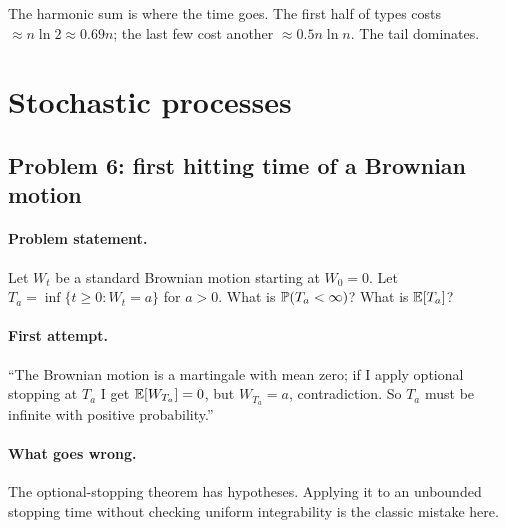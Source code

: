 \begin{intuitionbox}
The harmonic sum is where the time goes.  The first half of types
costs $\approx n \ln 2 \approx 0.69 n$; the last few cost another
$\approx 0.5 n \ln n$.  The tail dominates.
\end{intuitionbox}

\section{Stochastic processes}
\label{sec:stoch-problems}

\subsection{Problem 6: first hitting time of a Brownian motion}
\label{sec:hitting}

\paragraph{Problem statement.}
Let $W_t$ be a standard Brownian motion starting at $W_0 = 0$.
Let $T_a = \inf\{t \ge 0 : W_t = a\}$ for $a > 0$.  What is
$\mathbb{P}(T_a < \infty)$?  What is $\mathbb{E}[T_a]$?

\paragraph{First attempt.}
``The Brownian motion is a martingale with mean zero; if I apply
optional stopping at $T_a$ I get $\mathbb{E}[W_{T_a}] = 0$, but
$W_{T_a} = a$, contradiction.  So $T_a$ must be infinite with
positive probability.''

\paragraph{What goes wrong.}
The optional-stopping theorem has hypotheses.  Applying it to an
unbounded stopping time without checking uniform integrability is
the classic mistake here.

